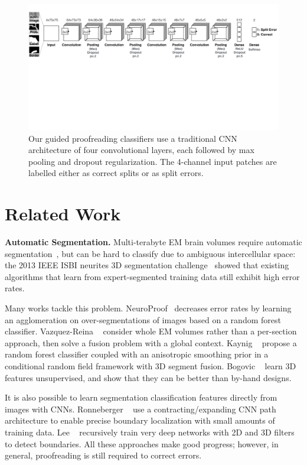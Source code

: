 \begin{figure}[t]
\centering
\includegraphics[width=\linewidth]{gfx/architecture.pdf}
\caption{Our guided proofreading classifiers use a traditional CNN architecture of four convolutional layers, each followed by max pooling and dropout regularization. The 4-channel input patches are labelled either as correct splits or as split errors.}
\label{fig:architecture}
\end{figure}

\section{Related Work}

\textbf{Automatic Segmentation.} Multi-terabyte EM brain volumes require automatic segmentation~\cite{jain2010,Liu2014,NunezIglesias2013Machine,GALA2014}, but can be hard to classify due to ambiguous intercellular space: the 2013 IEEE ISBI neurites 3D segmentation challenge~\cite{isbi_challenge} showed that existing algorithms that learn from expert-segmented training data still exhibit high error rates.

Many works tackle this problem. NeuroProof~\cite{neuroproof2013} decreases error rates by learning an agglomeration on over-segmentations of images based on a random forest classifier. Vazquez-Reina \etal~\cite{amelio_segmentation} consider whole EM volumes rather than a per-section approach, then solve a fusion problem with a global context. Kaynig \etal~\cite{kaynig10} propose a random forest classifier coupled with an anisotropic smoothing prior in a conditional random field framework with 3D segment fusion. Bogovic \etal~\cite{BogovicHJ13} learn 3D features unsupervised, and show that they can be better than by-hand designs.

It is also possible to learn segmentation classification features directly from images with CNNs. Ronneberger \etal~\cite{RonnebergerFB15} use a contracting/expanding CNN path architecture to enable precise boundary localization with small amounts of training data. Lee \etal~\cite{lee2015recursive} recursively train very deep networks with 2D and 3D filters to detect boundaries.
%
All these approaches make good progress; however, in general, proofreading is still required to correct errors.

